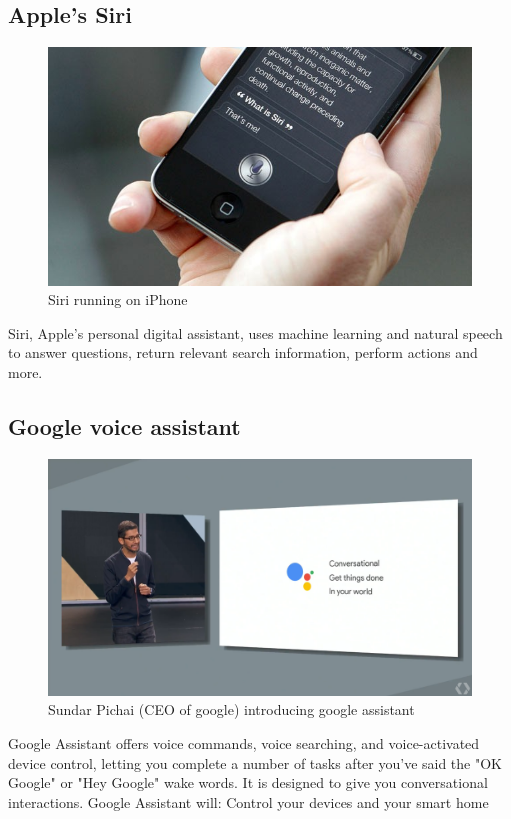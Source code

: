 \documentclass[11pt]{article}
\begin{document}
\subsection{Apple's Siri}
\label{sec:org6a0324b}
\begin{figure}[htbp]
\centering
\includegraphics[width=.9\linewidth]{./img/siri.png}
\caption{\label{fig:orge7ac773}Siri running on iPhone}
\end{figure}
Siri, Apple's personal digital assistant, uses machine learning and natural speech
to answer questions, return relevant search information, perform actions and more.

\subsection{Google voice assistant}
\label{sec:orgec8a996}
\begin{figure}[htbp]
\centering
\includegraphics[width=.9\linewidth]{./img/google-assistant.png}
\caption{\label{fig:org381f69d}Sundar Pichai (CEO of google) introducing google assistant}
\end{figure}
Google Assistant offers voice commands, voice searching, and voice-activated
device control, letting you complete a number of tasks after you've said the
"OK Google" or "Hey Google" wake words. It is designed to give you conversational
interactions. Google Assistant will: Control your devices and your smart home
\clearpage
\end{document}
